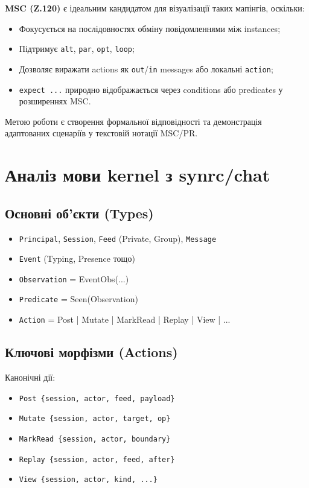 \documentclass[11pt,a4paper]{article}
\begin{document}
\textbf{MSC (Z.120)} є ідеальним кандидатом для візуалізації таких мапінгів, оскільки:
\begin{itemize}
    \item Фокусується на послідовностях обміну повідомленнями між instances;
    \item Підтримує \texttt{alt}, \texttt{par}, \texttt{opt}, \texttt{loop};
    \item Дозволяє виражати actions як \texttt{out}/\texttt{in} messages або локальні \texttt{action};
    \item \texttt{expect ...} природно відображається через conditions або predicates у розширеннях MSC.
\end{itemize}

Метою роботи є створення формальної відповідності та демонстрація адаптованих сценаріїв у текстовій нотації MSC/PR.

\section{Аналіз мови kernel з synrc/chat}

\subsection{Основні об'єкти (Types)}
\begin{itemize}
    \item \texttt{Principal}, \texttt{Session}, \texttt{Feed} (Private, Group), \texttt{Message}
    \item \texttt{Event} (Typing, Presence тощо)
    \item \texttt{Observation} = EventObs(...)
    \item \texttt{Predicate} = Seen(Observation)
    \item \texttt{Action} = Post | Mutate | MarkRead | Replay | View | ...
\end{itemize}

\subsection{Ключові морфізми (Actions)}
Канонічні дії:
\begin{itemize}
    \item \texttt{Post \{session, actor, feed, payload\}}
    \item \texttt{Mutate \{session, actor, target, op\}}
    \item \texttt{MarkRead \{session, actor, boundary\}}
    \item \texttt{Replay \{session, actor, feed, after\}}
    \item \texttt{View \{session, actor, kind, ...\}}
\end{itemize}
\end{document}

